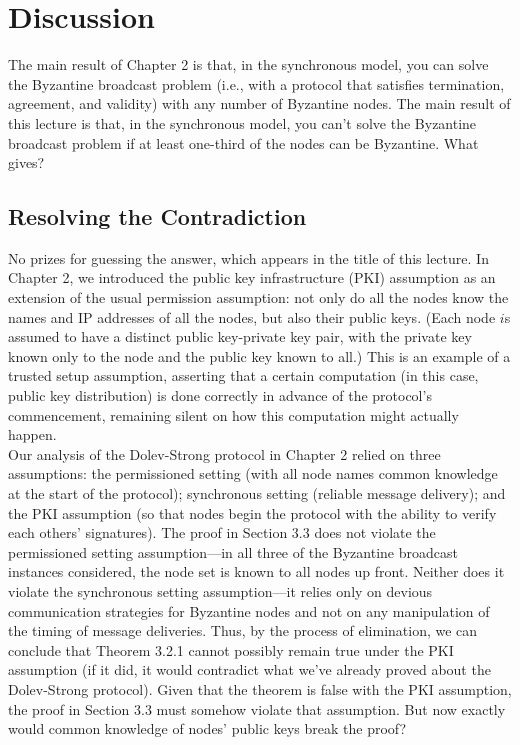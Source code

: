 \section{Discussion}
The main result of Chapter 2 is that, in the synchronous model, you can solve the Byzantine
broadcast problem (i.e., with a protocol that satisfies termination, agreement, and validity)
with any number of Byzantine nodes. The main result of this lecture is that, in the synchronous model, you can’t solve the Byzantine broadcast problem if at least one-third of the nodes can be Byzantine. What gives?

\subsection{Resolving the Contradiction}
No prizes for guessing the answer, which appears in the title of this lecture. In Chapter 2,
we introduced the public key infrastructure (PKI) assumption as an extension of the usual
permission assumption: not only do all the nodes know the names and IP addresses of all the
nodes, but also their public keys. (Each node $i$s assumed to have a distinct public key-private key pair, with the private key known only to the node and the public key known to all.) This is an example of a trusted setup assumption, asserting that a certain computation (in this
case, public key distribution) is done correctly in advance of the protocol’s commencement,
remaining silent on how this computation might actually happen.\\
Our analysis of the Dolev-Strong protocol in Chapter 2 relied on three assumptions: the
permissioned setting (with all node names common knowledge at the start of the protocol);
synchronous setting (reliable message delivery); and the PKI assumption (so that nodes begin
the protocol with the ability to verify each others’ signatures). The proof in Section 3.3 does
not violate the permissioned setting assumption—in all three of the Byzantine broadcast
instances considered, the node set is known to all nodes up front. Neither does it violate
the synchronous setting assumption—it relies only on devious communication strategies for
Byzantine nodes and not on any manipulation of the timing of message deliveries. Thus, by
the process of elimination, we can conclude that Theorem 3.2.1 cannot possibly remain true
under the PKI assumption (if it did, it would contradict what we've already proved about
the Dolev-Strong protocol). Given that the theorem is false with the PKI assumption, the
proof in Section 3.3 must somehow violate that assumption. But now exactly would common
knowledge of nodes’ public keys break the proof?


